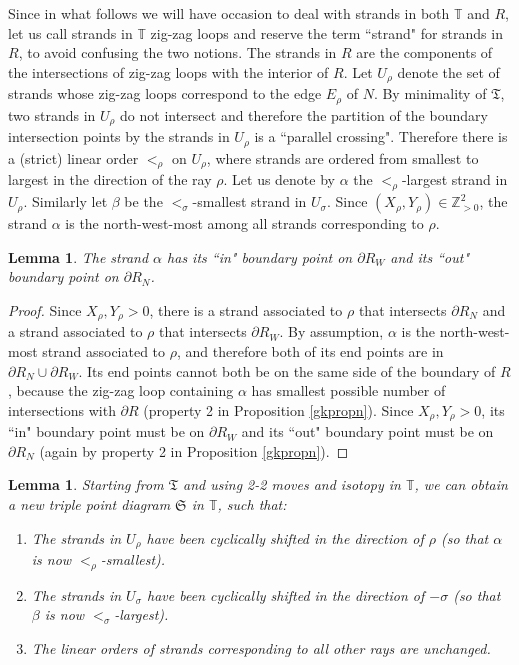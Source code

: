 \documentclass[11pt]{article} %
\newtheorem{lemma}[theorem]{Lemma}
\theoremstyle{definition}
\newcommand{\Z}{{\mathbb Z}}
\newcommand{\T}{{\mathbb T}}
\newcommand{\la}{\label}
\begin{document}
Since in what follows we will have occasion to deal with strands in both $\T$ and $R$, let us call strands in $\T$ zig-zag loops and reserve the term ``strand" for strands in $R$, to avoid confusing the two notions. The strands in $R$ are the components of the intersections of zig-zag loops with the interior of $R$. Let $U_\rho$ denote the set of strands whose zig-zag loops correspond to the edge $E_\rho$ of $N$. By minimality of $\mathfrak T$, two strands in $U_\rho$ do not intersect and therefore the partition of the boundary intersection points by the strands in $U_\rho$ is a ``parallel crossing". Therefore there is a (strict) linear order $<_\rho$ on $U_\rho$, where strands are ordered from smallest to largest in the direction of the ray $\rho$. Let us denote by $\alpha$ the $<_\rho$-largest strand in $U_\rho$. Similarly let $\beta$ be the $<_\sigma$-smallest strand in $U_\sigma$. Since $(X_\rho,Y_\rho) \in \Z_{>0}^2$, the strand $\alpha$ is the north-west-most among all strands corresponding to $\rho$. 

\begin{lemma}\la{westtonorth}
The strand $\alpha$ has its ``in" boundary point on $\partial R_W$ and its ``out" boundary point on $\partial R_N$.
\end{lemma}
\begin{proof}
Since $X_\rho,Y_\rho>0$, there is a strand associated to $\rho$ that intersects $\partial R_N$ and a strand associated to $\rho$ that intersects $\partial R_W$. By assumption, $\alpha$ is the north-west-most strand associated to $\rho$, and therefore both of its end points are in $\partial R_N \cup \partial R_W$. Its end points cannot both be on the same side of the boundary of $R$, because the zig-zag loop containing $\alpha$ has smallest possible number of intersections with $\partial R$ (property 2 in Proposition \ref{gkpropn}). Since $X_\rho,Y_\rho>0$, its ``in" boundary point must be on $\partial R_W$ and its ``out" boundary point must be on $\partial R_N$ (again by property 2 in Proposition \ref{gkpropn}). 
\end{proof}

\begin{lemma}\la{keylem}
Starting from $\mathfrak T$ and using 2-2 moves and isotopy in $\T$, we can obtain a new triple point diagram $\mathfrak S$ in $\T$, such that:
\begin{enumerate}
    \item The strands in $U_\rho$ have been cyclically shifted in the direction of $\rho$ (so that $\alpha$ is now $<_\rho$-smallest).
    \item The strands in $U_\sigma$ have been cyclically shifted in the direction of $-\sigma$ (so that $\beta$ is now $<_\sigma$-largest).
    \item The linear orders  of strands corresponding to all other rays are unchanged. 
\end{enumerate}

\end{lemma}
\end{document}
